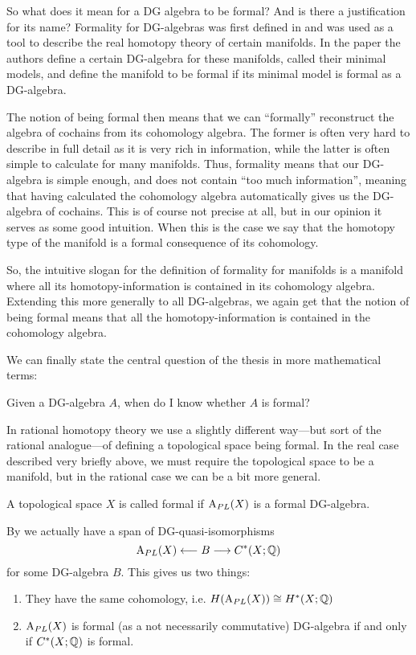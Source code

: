 So what does it mean for a DG algebra to be formal? And is there a justification for its name? Formality for DG-algebras was first defined in \cite{DGMS} and was used as a tool to describe the real homotopy theory of certain manifolds. In the paper the authors define a certain DG-algebra for these manifolds, called their minimal models, and define the manifold to be formal if its minimal model is formal as a DG-algebra. 

The notion of being formal then means that we can ``formally'' reconstruct the algebra of cochains from its cohomology algebra. The former is often very hard to describe in full detail as it is very rich in information, while the latter is often simple to calculate for many manifolds. Thus, formality means that our DG-algebra is simple enough, and does not contain ``too much information'', meaning that having calculated the cohomology algebra automatically gives us the DG-algebra of cochains. This is of course not precise at all, but in our opinion it serves as some good intuition. When this is the case we say that the homotopy type of the manifold is a formal consequence of its cohomology. 

So, the intuitive slogan for the definition of formality for manifolds is a manifold where all its homotopy-information is contained in its cohomology algebra. Extending this more generally to all DG-algebras, we again get that the notion of being formal means that all the homotopy-information is contained in the cohomology algebra.

We can finally state the central question of the thesis in more mathematical terms:
\begin{central}
Given a DG-algebra $A$, when do I know whether $A$ is formal? 
\end{central}

In rational homotopy theory we use a slightly different way---but sort of the rational analogue---of defining a topological space being formal. In the real case described very briefly above, we must require the topological space to be a manifold, but in the rational case we can be a bit more general. 


\begin{definition}
A topological space $X$ is called formal if $\text{A}_{PL}(X)$ is a formal DG-algebra. 
\end{definition}

By \cite[Corollary 10.10]{FHT} we actually have a span of DG-quasi-isomorphisms 
\begin{equation*}
    \text{A}_{PL}(X)\longleftarrow B \longrightarrow C^*(X;\mathbb{Q})
\end{equation*}
for some DG-algebra $B$. This gives us two things:
\begin{enumerate}
    \item They have the same cohomology, i.e. $H(\text{A}_{PL}(X)) \cong H^*(X;\mathbb{Q})$
    \item $\text{A}_{PL}(X)$ is formal (as a not necessarily commutative) DG-algebra if and only if $C^*(X;\mathbb{Q})$ is formal. 
\end{enumerate}

